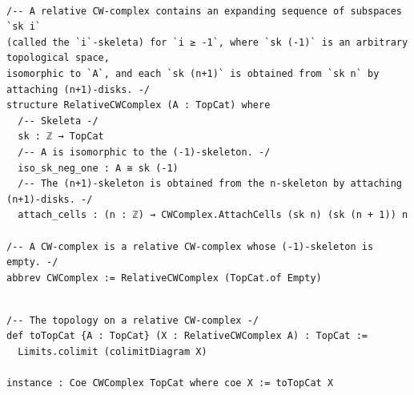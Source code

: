 \documentclass{book}
\theoremstyle{definition}
\newcounter{lcounter}
\begin{document}
\begin{center}
\begin{tcolorbox}[width=5in,colback={white},title={\begin{center}\texttt{Lean \thelcounter} \addtocounter{lcounter}{1}  \end{center}},colbacktitle=Blue,coltitle=black]
\begin{verbatim}

/-- A relative CW-complex contains an expanding sequence of subspaces `sk i`
(called the `i`-skeleta) for `i ≥ -1`, where `sk (-1)` is an arbitrary topological space,
isomorphic to `A`, and each `sk (n+1)` is obtained from `sk n` by attaching (n+1)-disks. -/
structure RelativeCWComplex (A : TopCat) where
  /-- Skeleta -/
  sk : ℤ → TopCat
  /-- A is isomorphic to the (-1)-skeleton. -/
  iso_sk_neg_one : A ≅ sk (-1)
  /-- The (n+1)-skeleton is obtained from the n-skeleton by attaching (n+1)-disks. -/
  attach_cells : (n : ℤ) → CWComplex.AttachCells (sk n) (sk (n + 1)) n

/-- A CW-complex is a relative CW-complex whose (-1)-skeleton is empty. -/
abbrev CWComplex := RelativeCWComplex (TopCat.of Empty)

\end{verbatim}
\end{tcolorbox}
\end{center}

\begin{center}
\begin{tcolorbox}[width=5in,colback={white},title={\begin{center}\texttt{Lean \thelcounter} \addtocounter{lcounter}{1}  \end{center}},colbacktitle=Blue,coltitle=black]
\begin{verbatim}

/-- The topology on a relative CW-complex -/
def toTopCat {A : TopCat} (X : RelativeCWComplex A) : TopCat :=
  Limits.colimit (colimitDiagram X)

instance : Coe CWComplex TopCat where coe X := toTopCat X

\end{verbatim}
\end{tcolorbox}
\end{center}
\end{document}

